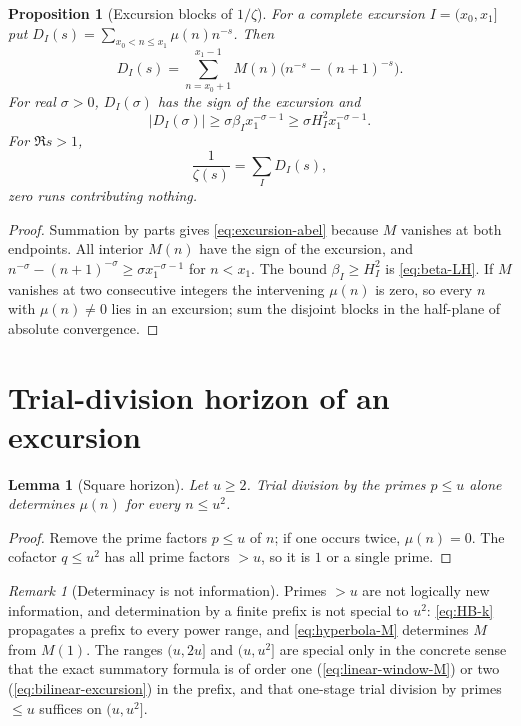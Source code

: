 \documentclass[11pt]{amsart}
\numberwithin{equation}{section}
\theoremstyle{plain}
\newtheorem{proposition}[theorem]{Proposition}
\newtheorem{lemma}[theorem]{Lemma}
\theoremstyle{definition}
\theoremstyle{remark}
\newtheorem{remark}[theorem]{Remark}
\begin{document}
\begin{proposition}[Excursion blocks of $1/\zeta$]
\label{prop:excursion-mellin}
For a complete excursion $I=(x_0,x_1]$ put
$D_I(s)=\sum_{x_0<n\le x_1}\mu(n)n^{-s}$. Then
\begin{equation}
\label{eq:excursion-abel}
D_I(s)=\sum_{n=x_0+1}^{x_1-1}M(n)
\bigl(n^{-s}-(n+1)^{-s}\bigr).
\end{equation}
For real $\sigma>0$, $D_I(\sigma)$ has the sign of the excursion and
\begin{equation}
\label{eq:excursion-mass-lower}
|D_I(\sigma)|\ge
\sigma\beta_I x_1^{-\sigma-1}
\ge\sigma H_I^2x_1^{-\sigma-1}.
\end{equation}
For $\Re s>1$,
\begin{equation}
\label{eq:1overzeta-excursions}
\frac1{\zeta(s)}=\sum_I D_I(s),
\end{equation}
zero runs contributing nothing.
\end{proposition}

\begin{proof}
Summation by parts gives \eqref{eq:excursion-abel} because $M$ vanishes at
both endpoints. All interior $M(n)$ have the sign of the excursion, and
$n^{-\sigma}-(n+1)^{-\sigma}\ge\sigma x_1^{-\sigma-1}$ for $n<x_1$. The
bound $\beta_I\ge H_I^2$ is \eqref{eq:beta-LH}. If $M$ vanishes at two
consecutive integers the intervening $\mu(n)$ is zero, so every $n$ with
$\mu(n)\ne0$ lies in an excursion; sum the disjoint blocks in the
half-plane of absolute convergence.
\end{proof}

\section{Trial-division horizon of an excursion}
\label{sec:prime_horizon}

\begin{lemma}[Square horizon]
\label{lem:square-horizon}
Let $u\ge2$. Trial division by the primes $p\le u$ alone determines $\mu(n)$
for every $n\le u^2$.
\end{lemma}

\begin{proof}
Remove the prime factors $p\le u$ of $n$; if one occurs twice, $\mu(n)=0$.
The cofactor $q\le u^2$ has all prime factors $>u$, so it is $1$ or a single
prime.
\end{proof}

\begin{remark}[Determinacy is not information]
\label{rem:information}
\label{warn:information_language}
Primes $>u$ are not logically new information, and determination by a
finite prefix is not special to $u^2$: \eqref{eq:HB-k} propagates a prefix
to every power range, and \eqref{eq:hyperbola-M} determines $M$ from $M(1)$.
The ranges $(u,2u]$ and $(u,u^2]$ are special only in the concrete sense
that the exact summatory formula is of order one
(\eqref{eq:linear-window-M}) or two (\eqref{eq:bilinear-excursion}) in the
prefix, and that one-stage trial division by primes $\le u$ suffices on
$(u,u^2]$.
\end{remark}
\end{document}
